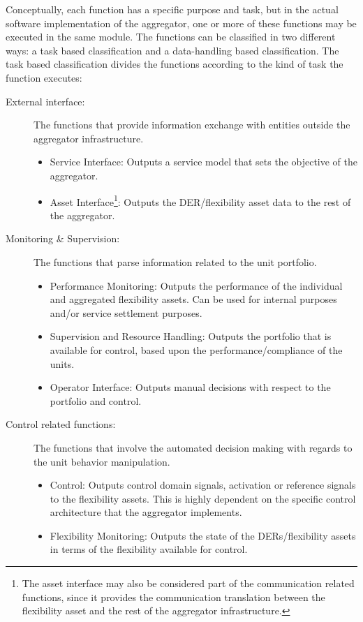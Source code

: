 Conceptually, each function has a specific purpose and task, but in the actual software implementation of the aggregator, one or more of these functions may be executed in the same module. The functions can be classified in two different ways: a task based classification and a data-handling based classification. The task based classification divides the functions according to the kind of task the function executes:
\begin{description}
	\item[External interface:] The functions that provide information exchange with entities outside the aggregator infrastructure.
		\begin{itemize}
			\item Service Interface: Outputs a service model that sets the objective of the aggregator.
			\item Asset Interface\footnote{The asset interface may also be considered part of the communication related functions, since it provides the communication translation between the flexibility asset and the rest of the aggregator infrastructure.}: Outputs the DER/flexibility asset data to the rest of the aggregator.
		\end{itemize}
	\item[Monitoring \& Supervision:] The functions that parse information related to the unit portfolio.
		\begin{itemize}
			\item Performance Monitoring: Outputs the performance of the individual and aggregated flexibility assets. Can be used for internal purposes and/or service settlement purposes.
			\item Supervision and Resource Handling: Outputs the portfolio that is available for control, based upon the performance/compliance of the units.
			\item Operator Interface: Outputs manual decisions with respect to the portfolio and control.
		\end{itemize}
	\item[Control related functions:] The functions that involve the automated decision making with regards to the unit behavior manipulation.
		\begin{itemize}
			\item Control: Outputs control domain signals, \eg activation or reference signals to the flexibility assets. This is highly dependent on the specific control architecture that the aggregator implements.
			\item Flexibility Monitoring: Outputs the state of the DERs/flexibility assets in terms of the flexibility available for control.

\end{itemize}
\end{description}
